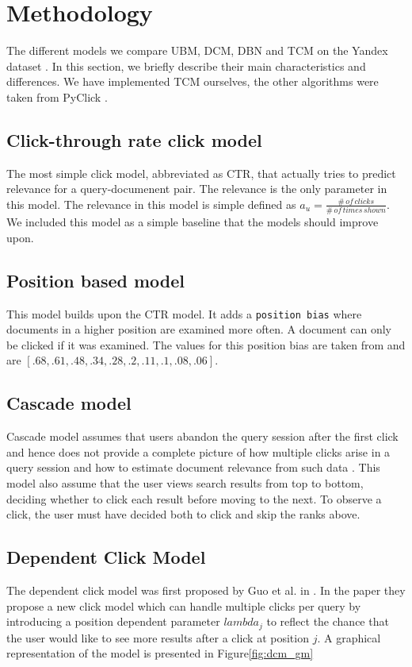\section{Methodology}
\label{sec:methodology}
The different models we compare UBM, DCM, DBN and TCM on the Yandex dataset \cite{yandex}. In this section, we briefly describe their main characteristics and differences. We have implemented TCM ourselves, the other algorithms were taken from PyClick \cite{PyClick}.

\subsection{Click-through rate click model}
The most simple click model, abbreviated as CTR, that actually tries to predict relevance for a query-documenent pair. The relevance is the only parameter in this model. The relevance in this model is simple defined as $a_u = \frac{\#\,of\,clicks}{\#\,of\,times\,shown}$. We included this model as a simple baseline that the models should improve upon.

\subsection{Position based model}
This model builds upon the CTR model. It adds a \texttt{position bias} where documents in a higher position are examined more often. A document can only be clicked if it was examined. The values for this position bias are taken from \cite{eye_track} and are $[.68, .61, .48, .34, .28, .2, .11, .1, .08, .06]$.

\subsection{Cascade model}
Cascade model assumes that users abandon the query session after the first click and hence does not provide a complete picture of how multiple clicks arise in a query session and how to estimate document relevance from such data \cite{Kempe2008, Craswell2008}. 
This model also assume that the user views search results from top to bottom, deciding whether to click each result before moving to the next. 
To observe a click, the user must have decided both to click and skip the ranks above.

\subsection{Dependent Click Model}
The dependent click model was first proposed by Guo et al. in \cite{Guo2009}. In the paper they propose a new click model which can handle multiple clicks per query by introducing a position dependent parameter $lambda_j$ to reflect the chance that the user would like to see more results after a click at position $j$. A graphical representation of the model is presented in Figure\ref{fig:dcm_gm} 

